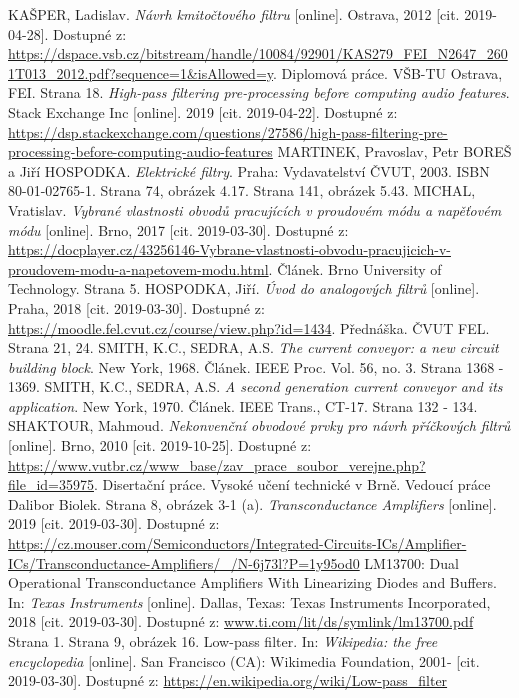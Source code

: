 \newpage
\begin{thebibliography}{999}
KAŠPER, Ladislav. \textit{Návrh kmitočtového filtru} [online]. Ostrava, 2012 [cit. 2019-04-28]. Dostupné z: \url{https://dspace.vsb.cz/bitstream/handle/10084/92901/KAS279_FEI_N2647_2601T013_2012.pdf?sequence=1&isAllowed=y}. Diplomová práce. VŠB-TU Ostrava, FEI. Strana 18.
\textit{High-pass filtering pre-processing before computing audio features}. Stack Exchange Inc [online]. 2019 [cit. 2019-04-22]. Dostupné z: \url{https://dsp.stackexchange.com/questions/27586/high-pass-filtering-pre-processing-before-computing-audio-features}
MARTINEK, Pravoslav, Petr BOREŠ a Jiří HOSPODKA. \textit{Elektrické filtry}. Praha: Vydavatelství ČVUT, 2003. ISBN 80-01-02765-1. Strana 74, obrázek 4.17. Strana 141, obrázek 5.43.
MICHAL, Vratislav. \textit{Vybrané vlastnosti obvodů pracujících v proudovém módu a napěťovém módu} [online]. Brno, 2017 [cit. 2019-03-30]. Dostupné z: \url{https://docplayer.cz/43256146-Vybrane-vlastnosti-obvodu-pracujicich-v-proudovem-modu-a-napetovem-modu.html}. Článek. Brno University of Technology. Strana 5.
HOSPODKA, Jiří. \textit{Úvod do analogových filtrů} [online]. Praha, 2018 [cit. 2019-03-30]. Dostupné z: \url{https://moodle.fel.cvut.cz/course/view.php?id=1434}. Přednáška. ČVUT FEL. Strana 21, 24.
SMITH, K.C., SEDRA, A.S. \textit{The current conveyor: a new circuit building block}. New York, 1968. Článek. IEEE Proc. Vol. 56, no. 3. Strana 1368 - 1369.
SMITH, K.C., SEDRA, A.S. \textit{A second generation current conveyor and its application}. New York, 1970. Článek. IEEE Trans., CT-17. Strana 132 - 134.
SHAKTOUR, Mahmoud. \textit{Nekonvenční obvodové prvky pro návrh příčkových filtrů} [online]. Brno, 2010 [cit. 2019-10-25]. Dostupné z: \url{https://www.vutbr.cz/www_base/zav_prace_soubor_verejne.php?file_id=35975}. Disertační práce. Vysoké učení technické v Brně. Vedoucí práce Dalibor Biolek. Strana 8, obrázek 3-1 (a).
\textit{Transconductance Amplifiers} [online]. 2019 [cit. 2019-03-30]. Dostupné z: \url{https://cz.mouser.com/Semiconductors/Integrated-Circuits-ICs/Amplifier-ICs/Transconductance-Amplifiers/_/N-6j73l?P=1y95od0}
LM13700: Dual Operational Transconductance Amplifiers With Linearizing Diodes and Buffers. In: \textit{Texas Instruments} [online]. Dallas, Texas: Texas Instruments Incorporated, 2018 [cit. 2019-03-30]. Dostupné z: \url{www.ti.com/lit/ds/symlink/lm13700.pdf} Strana 1. Strana 9, obrázek 16.
Low-pass filter. In: \textit{Wikipedia: the free encyclopedia} [online]. San Francisco (CA): Wikimedia Foundation, 2001- [cit. 2019-03-30]. Dostupné z: \url{https://en.wikipedia.org/wiki/Low-pass_filter}

\end{thebibliography}
